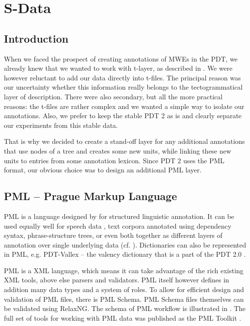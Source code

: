 
\chapter{S-Data}
\label{sec:s}


\section{Introduction}
\label{sec:s:intro}
When we faced the prospect of creating annotations of MWEs in the PDT, we already knew that we wanted to work with t-layer, as described in . We were however reluctant to add our data directly into t-files. The principal reason was our uncertainty whether this information really belongs to the tectogrammatical layer of description. There were also secondary, but all the more practical reasons: the t-files are rather complex and we wanted a simple way to isolate our annotations. Also, we prefer to keep the stable PDT 2 as is and clearly separate our experiments from this stable data. 

That is why we decided to create a stand-off layer for any additional annotations that use nodes of a tree and creates some new units, while linking these new units to entries from some annotation lexicon. Since PDT 2 uses the PML format, our obvious choice was to design an additional PML layer.


\section{PML -- Prague Markup Language}
\label{sec:pml}
PML is a language designed by \citet{pajas:2005} for structured linguistic annotation. It can be used equally well for speech data \citep{hajic:2008}, text corpora annotated using dependency syntax, phrase-structure trees, or even both together as different layers of annotation over single underlying data (cf. \citealp{cinkova:2009}). Dictionaries can also be represented in PML, e.g. PDT-Vallex -- the valency dictionary that is a part of the PDT 2.0 \citep{pdtvallex:2003a}.

PML is a XML language, which means it can take advantage of the rich existing XML tools, above else parsers and validators. PML itself however defines in addition many data types and a system of roles. To allow for efficient design and validation of PML files, there is PML Schema. PML Schema files themselves can be validated using RelaxNG. The schema of PML workflow is illustrated in . The full set of tools for working with PML data was published as the PML Toolkit \citep{pajas:2009}.

